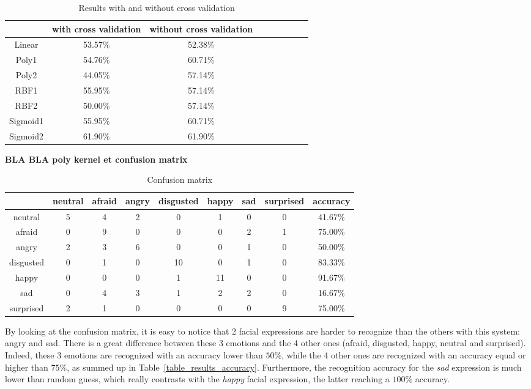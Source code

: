 \begin{table}[h]
   \caption{\label{table_results_crossvalidation} Results with and without cross validation}
\begin{tabular}{|c|c|c|c|c|c|c|c|c|}
  \hline
    & with cross validation & without cross validation \\
  \hline
  Linear & 53.57\% & 52.38\% \\
  Poly1 & 54.76\% & 60.71\% \\
  Poly2 & 44.05\% & 57.14\% \\
  RBF1 & 55.95\% & 57.14\% \\
  RBF2 & 50.00\% & 57.14\% \\
  Sigmoid1 & 55.95\% & 60.71\% \\
  Sigmoid2 & 61.90\% & 61.90\% \\
  \hline
\end{tabular}
\end{table}

\noindent \textbf{\color{red} BLA BLA poly kernel et confusion matrix}
\newline 


\begin{table}[h]
   \caption{\label{table_results_confusion_matrix} Confusion matrix}
\begin{tabular}{|c|c|c|c|c|c|c|c|c|}
  \hline
   & neutral & afraid & angry & disgusted & happy & sad & surprised & accuracy \\
  \hline
  neutral & 5 & 4 & 2 & 0 & 1 & 0 & 0 & 41.67\% \\
  afraid & 0 & 9 & 0 & 0 & 0 & 2 & 1 & 75.00\% \\
  angry & 2 & 3 & 6 & 0 & 0 & 1 & 0 & 50.00\% \\
  disgusted & 0 & 1 & 0 & 10 & 0 & 1 & 0 & 83.33\% \\
  happy & 0 & 0 & 0 & 1 & 11 & 0 & 0 & 91.67\% \\
  sad & 0 & 4 & 3 & 1 & 2 & 2 & 0 & 16.67\% \\
  surprised & 2 & 1 & 0 & 0 & 0 & 0 & 9 & 75.00\%\\
  \hline
\end{tabular}
\end{table}

\noindent By looking at the confusion matrix, it is easy to notice that 2 facial expressions are harder to recognize than the others with this system: angry and sad. There is a great difference between these 3 emotions and the 4 other ones (afraid, disgusted, happy, neutral and surprised). Indeed, these 3 emotions are recognized with an accuracy lower than $ 50\% $, while the 4 other ones are recognized with an accuracy equal or higher than $ 75\% $, as summed up in Table~\ref{table_results_accuracy}. Furthermore, the recognition accuracy for the \textit{sad} expression is much lower than random guess, which really contrasts with the \textit{happy} facial expression, the latter reaching a $100\%$ accuracy.
\newline

